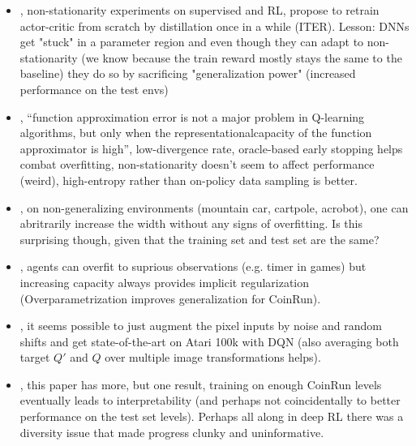 \begin{itemize}
    \item \citet{igl2020impact}, non-stationarity experiments on supervised and RL, propose to retrain actor-critic from scratch by distillation once in a while (ITER). Lesson: DNNs get "stuck" in a parameter region and even though they can adapt to non-stationarity (we know because the train reward mostly stays the same to the baseline) they do so by sacrificing "generalization power" (increased performance on the test envs)
    \item \citet{fu2019diagnosing}, ``function approximation error is not a major problem in Q-learning algorithms, but only when the representationalcapacity of the function approximator is high'', low-divergence rate, oracle-based early stopping helps combat overfitting, non-stationarity doesn't seem to affect performance (weird), high-entropy rather than on-policy data sampling is better.
    \item \citet{neal2019support}, on non-generalizing environments (mountain car, cartpole, acrobot), one can abritrarily increase the width without any signs of overfitting. Is this surprising though, given that the training set and test set are the same?
    \item \citet{Song2020Observational}, agents can overfit to suprious observations (e.g. timer in games) but increasing capacity always provides implicit regularization (Overparametrization improves generalization for CoinRun).
    \item \citet{kostrikov2020image}, it seems possible to just augment the pixel inputs by noise and random shifts and get state-of-the-art on Atari 100k with DQN (also averaging both target $Q'$ and $Q$ over multiple image transformations helps).
    \item \citet{hilton2020understanding}, this paper has more, but one result, training on enough CoinRun levels eventually leads to interpretability (and perhaps not coincidentally to better performance on the test set levels). Perhaps all along in deep RL there was a diversity issue that made progress clunky and uninformative.
\end{itemize}

